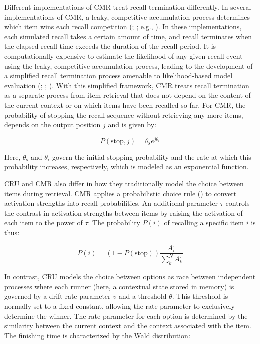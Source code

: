 \documentclass[
  man,
  floatsintext,
  longtable,
  nolmodern,
  notxfonts,
  notimes,
  draftfirst,
  colorlinks=true,linkcolor=blue,citecolor=blue,urlcolor=blue]{apa7}
\begin{document}
Different implementations of CMR treat recall termination differently.
In several implementations of CMR, a leaky, competitive accumulation
process determines which item wins each recall competition
(;
; e.g.,
). In these
implementations, each simulated recall takes a certain amount of time,
and recall terminates when the elapsed recall time exceeds the duration
of the recall period. It is computationally expensive to estimate the
likelihood of any given recall event using the leaky, competitive
accumulation process, leading to the development of a simplified recall
termination process amenable to likelihood-based model evaluation
(;
;
). With this
simplified framework, CMR treats recall termination as a separate
process from item retrieval that does not depend on the content of the
current context or on which items have been recalled so far. For CMR,
the probability of stopping the recall sequence without retrieving any
more items, depends on the output position \(j\) and is given by:

\[
P(\text{stop}, j) = \theta_\text{s} e^{j\theta_\text{r}}
\]

Here, \(\theta_\text{s}\) and \(\theta_\text{r}\) govern the initial
stopping probability and the rate at which this probability increases,
respectively, which is modeled as an exponential function.

CRU and CMR also differ in how they traditionally model the choice
between items during retrieval. CMR applies a probabilistic choice rule
() to convert activation
strengths into recall probabilities. An additional parameter \(\tau\)
controls the contrast in activation strengths between items by raising
the activation of each item to the power of \(\tau\). The probability
\(P(i)\) of recalling a specific item \(i\) is thus:

\[
P(i) = (1-P(\text{stop}))\frac{A^{\tau}_i}{\sum_{k}^{N}A^{\tau}_k}
\]

In contrast, CRU models the choice between options as race between
independent processes where each runner (here, a contextual state stored
in memory) is governed by a drift rate parameter \(v\) and a threshold
\(\theta\). This threshold is normally set to a fixed constant, allowing
the rate parameter to exclusively determine the winner. The rate
parameter for each option is determined by the similarity between the
current context and the context associated with the item. The finishing
time is characterized by the Wald distribution:
\end{document}
